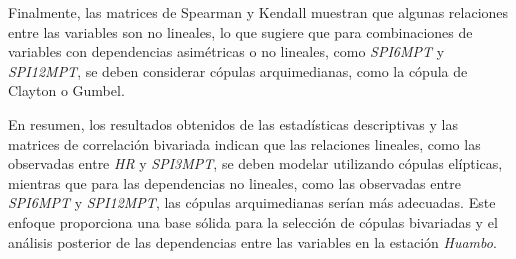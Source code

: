 Finalmente, las matrices de Spearman y Kendall muestran que algunas relaciones entre las variables son no lineales, lo que sugiere que para combinaciones de variables con dependencias asimétricas o no lineales, como \textit{SPI6MPT} y \textit{SPI12MPT}, se deben considerar cópulas arquimedianas, como la cópula de Clayton o Gumbel.

En resumen, los resultados obtenidos de las estadísticas descriptivas y las matrices de correlación bivariada indican que las relaciones lineales, como las observadas entre \textit{HR} y \textit{SPI3MPT}, se deben modelar utilizando cópulas elípticas, mientras que para las dependencias no lineales, como las observadas entre \textit{SPI6MPT} y \textit{SPI12MPT}, las cópulas arquimedianas serían más adecuadas. Este enfoque proporciona una base sólida para la selección de cópulas bivariadas y el análisis posterior de las dependencias entre las variables en la estación \textit{Huambo}.



